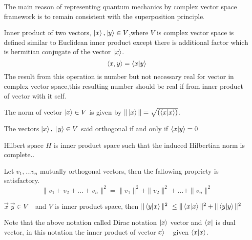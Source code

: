 The main reason of representing quantum mechanics by complex  vector space framework is to remain consistent with the superposition principle.
\begin{defn}

Inner product of  two vectors, $\ket{x} ,\ket{y }\in V$,where $V$ is complex vector space  is defined similar to Euclidean inner product except there is additional factor which is hermitian conjugate of the vector $\ket{x}$.
$$\left\langle x,y\right\rangle=\bra{x}\ket{y }$$
The result from this operation is number but not necessary real for vector in complex vector space,this resulting number  should be real if from inner product of vector with it self.
\end{defn}
\begin{defn}

The norm of vector $\ket{x} \in V$ is given by $\| \ket{x}\|=\sqrt{\left(\bra{x}\ket{x}\right)}$.
\end{defn}

\begin{defn}[orthogonal]

The vectors $\ket{x},~ \ket{y} \in V$ said orthogonal if and  only if $\bra{x}\ket{y}=0$
\end{defn}

\begin{defn}

Hilbert space $H$ is inner product space such that the induced Hilbertian norm is complete.\citep{book:4365}.
\end{defn}

\begin{defn}[Pythagoras]

Let $v_1,\dots v_n$ mutually orthogonal vectors, then the fallowing propriety  is satisfactory.
$$\|v_1+v_2+\dots+v_n\|^2=\| v_1\|^2+\| v_2\|^2+\dots +\| v_n\|^2$$
\end{defn}

\begin{defn}

$\vec{x} ~\vec{y} \in V $ ~ and $V$ is inner product space,
then $\|\bra{y}\ket{x}\|^2~\leq \| \braket{x}{x} \|^2+\|\bra{y} \ket{y} \|^2$
\end{defn}

Note that the above notation called Dirac notation $\ket{x}$ vector and $\bra{x}$ is dual vector, in this notation the inner product of vector$\ket{x}$ ~ given $\bra{x}\ket{x}$.

